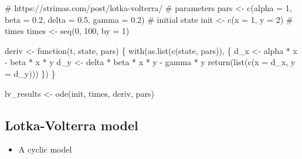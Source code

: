 \documentclass[
  letterpaper,
  DIV=11,
  numbers=noendperiod]{scrartcl}
\newenvironment{Shaded}{\begin{snugshade}}{\end{snugshade}}
\newcommand{\AttributeTok}[1]{\textcolor[rgb]{0.40,0.45,0.13}{#1}}
\newcommand{\CommentTok}[1]{\textcolor[rgb]{0.37,0.37,0.37}{#1}}
\newcommand{\ControlFlowTok}[1]{\textcolor[rgb]{0.00,0.23,0.31}{#1}}
\newcommand{\DecValTok}[1]{\textcolor[rgb]{0.68,0.00,0.00}{#1}}
\newcommand{\FloatTok}[1]{\textcolor[rgb]{0.68,0.00,0.00}{#1}}
\newcommand{\FunctionTok}[1]{\textcolor[rgb]{0.28,0.35,0.67}{#1}}
\newcommand{\NormalTok}[1]{\textcolor[rgb]{0.00,0.23,0.31}{#1}}
\newcommand{\OtherTok}[1]{\textcolor[rgb]{0.00,0.23,0.31}{#1}}
\newcommand{\SpecialCharTok}[1]{\textcolor[rgb]{0.37,0.37,0.37}{#1}}
\providecommand{\tightlist}{%
  \setlength{\itemsep}{0pt}\setlength{\parskip}{0pt}}\usepackage{longtable,booktabs,array}
\begin{document}
\begin{Shaded}
\begin{Highlighting}[]
\CommentTok{\# https://strimas.com/post/lotka{-}volterra/}
\CommentTok{\# parameters}
\NormalTok{pars }\OtherTok{\textless{}{-}} \FunctionTok{c}\NormalTok{(}\AttributeTok{alpha =} \DecValTok{1}\NormalTok{, }\AttributeTok{beta =} \FloatTok{0.2}\NormalTok{, }\AttributeTok{delta =} \FloatTok{0.5}\NormalTok{, }\AttributeTok{gamma =} \FloatTok{0.2}\NormalTok{)}
\CommentTok{\# initial state }
\NormalTok{init }\OtherTok{\textless{}{-}} \FunctionTok{c}\NormalTok{(}\AttributeTok{x =} \DecValTok{1}\NormalTok{, }\AttributeTok{y =} \DecValTok{2}\NormalTok{)}
\CommentTok{\# times}
\NormalTok{times }\OtherTok{\textless{}{-}} \FunctionTok{seq}\NormalTok{(}\DecValTok{0}\NormalTok{, }\DecValTok{100}\NormalTok{, }\AttributeTok{by =} \DecValTok{1}\NormalTok{)}

\NormalTok{deriv }\OtherTok{\textless{}{-}} \ControlFlowTok{function}\NormalTok{(t, state, pars) \{}
  \FunctionTok{with}\NormalTok{(}\FunctionTok{as.list}\NormalTok{(}\FunctionTok{c}\NormalTok{(state, pars)), \{}
\NormalTok{    d\_x }\OtherTok{\textless{}{-}}\NormalTok{ alpha }\SpecialCharTok{*}\NormalTok{ x }\SpecialCharTok{{-}}\NormalTok{ beta }\SpecialCharTok{*}\NormalTok{ x }\SpecialCharTok{*}\NormalTok{ y}
\NormalTok{    d\_y }\OtherTok{\textless{}{-}}\NormalTok{ delta }\SpecialCharTok{*}\NormalTok{ beta }\SpecialCharTok{*}\NormalTok{ x }\SpecialCharTok{*}\NormalTok{ y }\SpecialCharTok{{-}}\NormalTok{ gamma }\SpecialCharTok{*}\NormalTok{ y}
    \FunctionTok{return}\NormalTok{(}\FunctionTok{list}\NormalTok{(}\FunctionTok{c}\NormalTok{(}\AttributeTok{x =}\NormalTok{ d\_x, }\AttributeTok{y =}\NormalTok{ d\_y)))}
\NormalTok{  \})}
\NormalTok{\}}

\NormalTok{lv\_results }\OtherTok{\textless{}{-}} \FunctionTok{ode}\NormalTok{(init, times, deriv, pars)}
\end{Highlighting}
\end{Shaded}

\hypertarget{lotka-volterra-model-3}{%
\subsection{Lotka-Volterra model}\label{lotka-volterra-model-3}}

\begin{itemize}
\tightlist
\item
  A cyclic model
\end{itemize}
\end{document}
